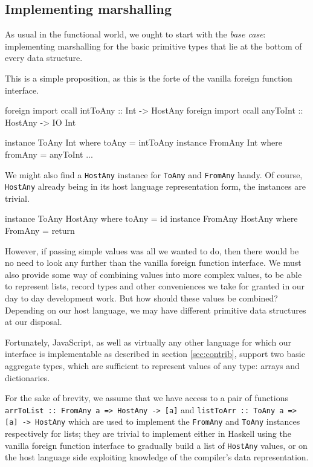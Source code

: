 \documentclass[preprint]{sigplanconf}
\begin{document}
\subsection{Implementing marshalling}\label{sec:marshalling}
As usual in the functional world, we ought to start with the \emph{base case}:
implementing marshalling for the basic primitive types that lie at the bottom
of every data structure.

This is a simple proposition, as this is the forte of the vanilla foreign
function interface.

\begin{code}
  foreign import ccall intToAny :: Int -> HostAny
  foreign import ccall anyToInt :: HostAny -> IO Int

  instance ToAny Int where toAny = intToAny
  instance FromAny Int where fromAny = anyToInt
  ...
\end{code}

We might also find a \lstinline!HostAny! instance for \lstinline!ToAny!
and \lstinline!FromAny! handy. Of course, \lstinline!HostAny! already being
in its host language representation form, the instances are trivial.

\begin{code}
  instance ToAny HostAny where toAny = id
  instance FromAny HostAny where FromAny = return
\end{code}

However, if passing simple values was all we wanted to do, then there would be
no need to look any further than the vanilla foreign function interface.
We must also provide some way of combining values into more complex values,
to be able to represent lists, record types and other conveniences we take for
granted in our day to day development work.
But how should these values be combined? Depending on our host language, we
may have different primitive data structures at our disposal.

Fortunately, JavaScript, as well as virtually any other
language for which our interface is implementable as described in section
\ref{sec:contrib}, support two basic aggregate types, which are sufficient to
represent values of any type: arrays and dictionaries.

For the sake of brevity, we assume that we have
access to a pair of functions
\lstinline!arrToList :: FromAny a => HostAny -> [a]!
and \lstinline!listToArr :: ToAny a => [a] -> HostAny!
which are used to implement the \lstinline!FromAny! and \lstinline!ToAny!
instances respectively for lists;
they are trivial to implement either in Haskell using the vanilla foreign
function interface to gradually build a list of \lstinline!HostAny! values,
or on the host language side exploiting knowledge of the compiler's
data representation.
\end{document}
